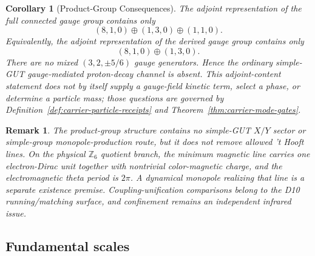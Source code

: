 \documentclass[11pt]{article}
\newtheorem{corollary}[theorem]{Corollary}
\newtheorem{remark}[theorem]{Remark}
\begin{document}
\begin{corollary}[Product-Group Consequences]
The adjoint representation of the full connected gauge group contains only
\[
(8,1,0)\oplus(1,3,0)\oplus(1,1,0).
\]
Equivalently, the adjoint representation of the derived gauge group contains only
\[
(8,1,0)\oplus(1,3,0).
\]
There are no mixed $(3,2,\pm 5/6)$ gauge generators. Hence the ordinary simple-GUT
gauge-mediated proton-decay channel is absent. This adjoint-content statement does not by itself
supply a gauge-field kinetic term, select a phase, or determine a particle mass; those questions
are governed by Definition~\ref{def:carrier-particle-receipts} and
Theorem~\ref{thm:carrier-mode-gates}.
\end{corollary}

\begin{remark}
The product-group structure contains no simple-GUT \(X/Y\) sector or simple-group monopole-production route, but it does not remove allowed 't Hooft lines. On the physical \(\mathbb Z_6\) quotient branch, the minimum magnetic line carries one electron-Dirac unit together with nontrivial color-magnetic charge, and the electromagnetic theta period is \(2\pi\). A dynamical monopole realizing that line is a separate existence premise. Coupling-unification comparisons belong to the D10 running/matching surface, and confinement remains an independent infrared issue.
\end{remark}

\subsection{Fundamental scales}
\end{document}
